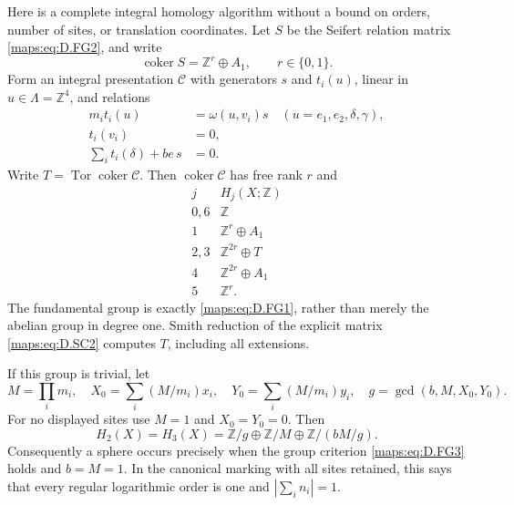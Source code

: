 \begin{theorem}
Here is a complete integral homology algorithm without a bound on
orders, number of sites, or translation coordinates. Let $S$ be the
Seifert relation matrix \eqref{maps:eq:D.FG2}, and write
\[
 \operatorname{coker}S=\mathbb Z^r\oplus A_1,\qquad r\in\{0,1\}.
\]
Form an integral presentation $\mathcal C$ with generators
$s$ and $t_i(u)$, linear in $u\in\Lambda=\mathbb Z^4$, and relations
\[
 \begin{split}
 m_i t_i(u)&=\omega(u,v_i)s\quad(u=e_1,e_2,\delta,\gamma),\\
 t_i(v_i)&=0,\\
 \sum_i t_i(\delta)+be\,s&=0.
 \end{split}                                                \tag{D.SC2}\label{maps:eq:D.SC2}
\]
Write $T=\operatorname{Tor}\operatorname{coker}\mathcal C$.
Then $\operatorname{coker}\mathcal C$ has free rank $r$ and
\[
\begin{array}{c|c}
 j&H_j(X;\mathbb Z)\\\hline
 0,6&\mathbb Z\\
 1&\mathbb Z^r\oplus A_1\\
 2,3&\mathbb Z^{2r}\oplus T\\
 4&\mathbb Z^{2r}\oplus A_1\\
 5&\mathbb Z^r.
\end{array}                                                 \tag{D.SC3}\label{maps:eq:D.SC3}
\]
The fundamental group is exactly \eqref{maps:eq:D.FG1}, rather than merely the
abelian group in degree one. Smith reduction of the explicit matrix
\eqref{maps:eq:D.SC2} computes $T$, including all extensions.

If this group is trivial, let
\[
 M=\prod_i m_i,\quad
 X_0=\sum_i(M/m_i)x_i,\quad Y_0=\sum_i(M/m_i)y_i,\quad
 g=\gcd(b,M,X_0,Y_0).
\]
For no displayed sites use $M=1$ and $X_0=Y_0=0$.
Then
\[
 H_2(X)=H_3(X)=
 \mathbb Z/g\oplus\mathbb Z/M\oplus\mathbb Z/(bM/g).          \tag{D.SC4}\label{maps:eq:D.SC4}
\]
Consequently a sphere occurs precisely when the group criterion
\eqref{maps:eq:D.FG3} holds and $b=M=1$. In the canonical marking with all sites
retained, this says that every regular logarithmic order is one and
$|\sum_i n_i|=1$.


\end{theorem}
